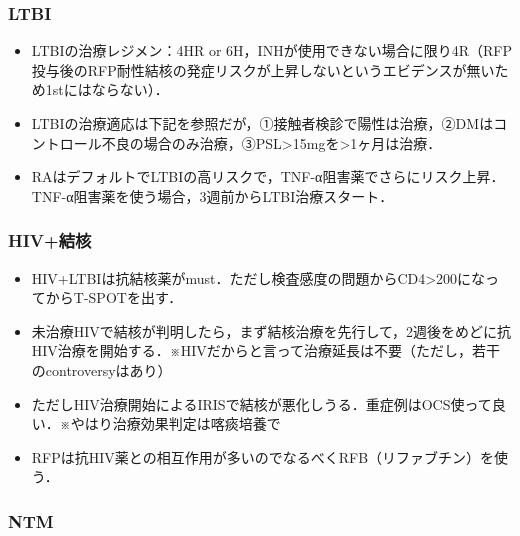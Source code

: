 \subsubsection{LTBI}

\begin{itemize}
\item LTBIの治療レジメン：4HR or 6H，INHが使用できない場合に限り4R（RFP投与後のRFP耐性結核の発症リスクが上昇しないというエビデンスが無いため1stにはならない）．
\item LTBIの治療適応は下記を参照だが，①接触者検診で陽性は治療，②DMはコントロール不良の場合のみ治療，③PSL>15mgを>1ヶ月は治療．
\item RAはデフォルトでLTBIの高リスクで，TNF-α阻害薬でさらにリスク上昇．TNF-α阻害薬を使う場合，3週前からLTBI治療スタート．


\end{itemize}


\subsubsection{HIV+結核}

\begin{itemize}
\item HIV+LTBIは抗結核薬がmust．ただし検査感度の問題からCD4>200になってからT-SPOTを出す．
\item 未治療HIVで結核が判明したら，まず結核治療を先行して，2週後をめどに抗HIV治療を開始する．※HIVだからと言って治療延長は不要（ただし，若干のcontroversyはあり）
\item ただしHIV治療開始によるIRISで結核が悪化しうる．重症例はOCS使って良い．※やはり治療効果判定は喀痰培養で
\item RFPは抗HIV薬との相互作用が多いのでなるべくRFB（リファブチン）を使う．

\end{itemize}

\subsubsection{NTM}

